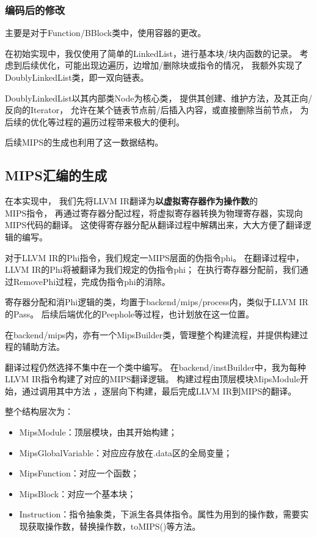 \subsubsection{编码后的修改}

主要是对于Function/BBlock类中，使用容器的更改。

在初始实现中，我仅使用了简单的LinkedList，进行基本块/块内函数的记录。
考虑到后续优化，可能出现边遍历，边增加/删除块或指令的情况，
我额外实现了DoublyLinkedList类，即一双向链表。

DoublyLinkedList以其内部类Node为核心类，
提供其创建、维护方法，及其正向/反向的Iterator，
允许在某个链表节点前/后插入内容，或直接删除当前节点，
为后续的优化等过程的遍历过程带来极大的便利。

后续MIPS的生成也利用了这一数据结构。

\subsection{MIPS汇编的生成}

在本实现中，
我们先将LLVM IR翻译为\textbf{以虚拟寄存器作为操作数}的\\MIPS指令，
再通过寄存器分配过程，将虚拟寄存器转换为物理寄存器，实现向MIPS代码的翻译。
这使得寄存器分配从翻译过程中解耦出来，大大方便了翻译逻辑的编写。

对于LLVM IR的Phi指令，我们规定一MIPS层面的伪指令phi。
在翻译过程中，LLVM IR的Phi将被翻译为我们规定的伪指令phi；
在执行寄存器分配前，我们通过RemovePhi过程，完成伪指令phi的消除。

寄存器分配和消Phi逻辑的类，均置于backend/mips/process内，类似于LLVM IR的Pass。
后续后端优化的Peephole等过程，也计划放在这一位置。

在backend/mips内，亦有一个MipsBuilder类，管理整个构建流程，并提供构建过程的辅助方法。

翻译过程仍然选择不集中在一个类中编写。
在backend/instBuilder中，我为每种LLVM IR指令构建了对应的MIPS翻译逻辑。
构建过程由顶层模块MipsModule开始，通过调用其中方法
，逐层向下构建，最后完成LLVM IR到MIPS的翻译。

整个结构层次为：
\begin{itemize}
    \item MipsModule：顶层模块，由其开始构建；
    \item MipsGlobalVariable：对应应存放在.data区的全局变量；
    \item MipsFunction：对应一个函数；
    \item MipsBlock：对应一个基本块；
    \item Instruction：指令抽象类，下派生各具体指令。属性为用到的操作数，需要实现获取操作数，替换操作数，toMIPS()等方法。
\end{itemize}

